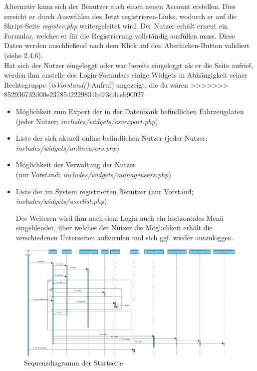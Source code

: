 \documentclass[fontsize = 12pt, paper = a4]{scrreprt}
\begin{document}
Alternativ kann sich der Benutzer auch einen neuen Account erstellen. Dies erreicht er durch Auswählen des \glqq Jetzt registrieren\grqq-Links, wodurch er auf die Skript-Seite \textit{register.php} weitergeleitet wird. Der Nutzer erhält erneut ein Formular, welches er für die Registrierung vollständig ausfüllen muss. Diese Daten werden anschließend nach dem Klick auf den Abschicken-Button validiert (siehe 2.4.6).\\
Hat sich der Nutzer eingeloggt oder war bereits eingeloggt als er die Seite aufrief, werden ihm anstelle des Login-Formulars einige Widgets in Abhängigkeit seiner Rechtegruppe (\textit{isVorstand()}-Aufruf) angezeigt, die da wären
>>>>>>> 852936732d00e2378542229831b473d4ceb90027

\begin{itemize}
 \item Möglichkeit zum Export der in der Datenbank befindlichen Fahrzeugdaten (jeder Nutzer; \textit{includes/widgets/csvexport.php})
 \item Liste der sich aktuell online befindlichen Nutzer (jeder Nutzer;\\ \textit{includes/widgets/onlineusers.php})
 \item Möglichkeit der Verwaltung der Nutzer\\ (nur Vorstand; \textit{includes/widgets/manageusers.php})
 \item Liste der im System registrierten Benutzer (nur Vorstand; \textit{includes/widgets/userlist.php})
 
Des Weiteren wird ihm nach dem Login auch ein horizontales Menü eingeblendet, über welches der Nutzer die Möglichkeit erhält die verschiedenen Unterseiten aufzurufen und sich ggf. wieder auszuloggen.
\end{itemize}

\begin{figure}[h]
\centering
\includegraphics[scale = 0.315]{startseite}
\caption[Sequenzdiagramm der Startseite]{Sequenzdiagramm der Startseite}
\label{index}
\end{figure}
\end{document}
